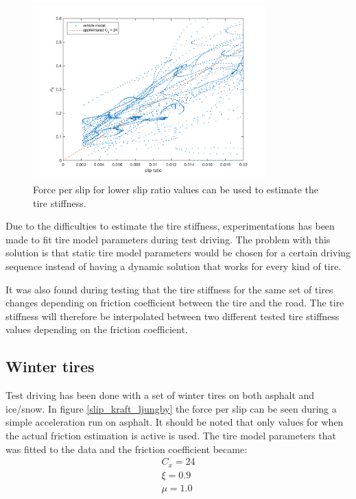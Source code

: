\begin{figure}[h]
	\centering
	\includegraphics[width=0.8\textwidth]{Pictures/slip_kraft_sma_slip}
	\caption {Force per slip for lower slip ratio values can be used to estimate the tire stiffness.}
	\label{slip_kraft_sma_slip}
\end{figure}

Due to the difficulties to estimate the tire stiffness, experimentations has been made to fit tire model parameters during test driving. The problem with this solution is that static tire model parameters would be chosen for a certain driving sequence instead of having a dynamic solution that works for every kind of tire. 

It was also found during testing that the tire stiffness for the same set of tires changes depending on friction coefficient between the tire and the road. The tire stiffness will therefore be interpolated between two different tested tire stiffness values depending on the friction coefficient.

\subsection{Winter tires}
\label{winter_tire}
Test driving has been done with a set of winter tires on both asphalt and ice/snow. In figure \ref{slip_kraft_ljungby} the force per slip can be seen during a simple acceleration run on asphalt. It should be noted that only values for when the actual friction estimation is active is used. The tire model parameters that was fitted to the data and the friction coefficient became:
\begin{equation}
\label{winter_asphalt}
\begin{split}
	C_{x} = 24 \\
	\xi = 0.9 \\
	\mu = 1.0 \\
\end{split}
\end{equation}


